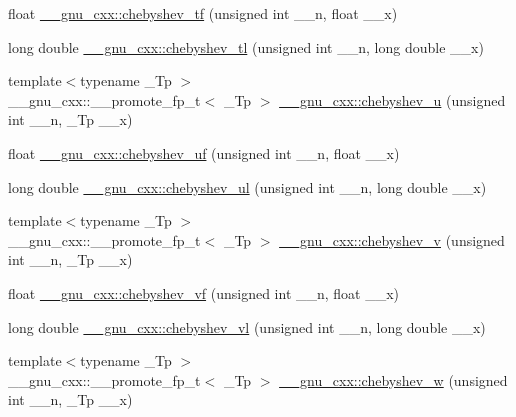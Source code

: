 \begin{DoxyCompactItemize}
\item 
float \hyperlink{group__gnu__math__spec__func_gab8cdb55702d9c8b85af4ecc3d8c6a134}{\+\_\+\+\_\+gnu\+\_\+cxx\+::chebyshev\+\_\+tf} (unsigned int \+\_\+\+\_\+n, float \+\_\+\+\_\+x)
\item 
long double \hyperlink{group__gnu__math__spec__func_ga0c421700d244cdf58e3ac5ff267664d1}{\+\_\+\+\_\+gnu\+\_\+cxx\+::chebyshev\+\_\+tl} (unsigned int \+\_\+\+\_\+n, long double \+\_\+\+\_\+x)
\item 
{\footnotesize template$<$typename \+\_\+\+Tp $>$ }\\\+\_\+\+\_\+gnu\+\_\+cxx\+::\+\_\+\+\_\+promote\+\_\+fp\+\_\+t$<$ \+\_\+\+Tp $>$ \hyperlink{group__gnu__math__spec__func_gaea7ea830fe6be79ca84fba1bb94691a4}{\+\_\+\+\_\+gnu\+\_\+cxx\+::chebyshev\+\_\+u} (unsigned int \+\_\+\+\_\+n, \+\_\+\+Tp \+\_\+\+\_\+x)
\item 
float \hyperlink{group__gnu__math__spec__func_ga4b28c2a079eae2e9612c9902801ca256}{\+\_\+\+\_\+gnu\+\_\+cxx\+::chebyshev\+\_\+uf} (unsigned int \+\_\+\+\_\+n, float \+\_\+\+\_\+x)
\item 
long double \hyperlink{group__gnu__math__spec__func_ga11ec202d6aacafba1182e962ecf02978}{\+\_\+\+\_\+gnu\+\_\+cxx\+::chebyshev\+\_\+ul} (unsigned int \+\_\+\+\_\+n, long double \+\_\+\+\_\+x)
\item 
{\footnotesize template$<$typename \+\_\+\+Tp $>$ }\\\+\_\+\+\_\+gnu\+\_\+cxx\+::\+\_\+\+\_\+promote\+\_\+fp\+\_\+t$<$ \+\_\+\+Tp $>$ \hyperlink{group__gnu__math__spec__func_ga674e3d97204a74620eb0d408873aefb9}{\+\_\+\+\_\+gnu\+\_\+cxx\+::chebyshev\+\_\+v} (unsigned int \+\_\+\+\_\+n, \+\_\+\+Tp \+\_\+\+\_\+x)
\item 
float \hyperlink{group__gnu__math__spec__func_gaa9635a0da4bdeaa8060ae5cf03c3a12d}{\+\_\+\+\_\+gnu\+\_\+cxx\+::chebyshev\+\_\+vf} (unsigned int \+\_\+\+\_\+n, float \+\_\+\+\_\+x)
\item 
long double \hyperlink{group__gnu__math__spec__func_gae387ee1bfcd52555ad4d690f5888a078}{\+\_\+\+\_\+gnu\+\_\+cxx\+::chebyshev\+\_\+vl} (unsigned int \+\_\+\+\_\+n, long double \+\_\+\+\_\+x)
\item 
{\footnotesize template$<$typename \+\_\+\+Tp $>$ }\\\+\_\+\+\_\+gnu\+\_\+cxx\+::\+\_\+\+\_\+promote\+\_\+fp\+\_\+t$<$ \+\_\+\+Tp $>$ \hyperlink{group__gnu__math__spec__func_ga55ebf3cda76302bc6e0f173fc1c1425e}{\+\_\+\+\_\+gnu\+\_\+cxx\+::chebyshev\+\_\+w} (unsigned int \+\_\+\+\_\+n, \+\_\+\+Tp \+\_\+\+\_\+x)
\item 

\end{DoxyCompactItemize}
